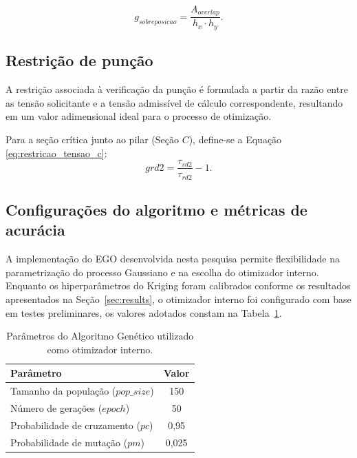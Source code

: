 \begin{equation}
g_{sobreposicao} = \frac{A_{overlap}}{h_x \cdot h_y}.
    \label{eq:restricao_sobreposicao}
\end{equation}

\subsection{Restrição de punção}

A restrição associada à verificação da punção é formulada a partir da razão entre as tensão solicitante e a tensão admissível de cálculo correspondente, resultando em um valor adimensional ideal para o processo de otimização.

Para a seção crítica junto ao pilar (Seção $C$), define-se a Equação \eqref{eq:restricao_tensao_c}:
\begin{equation}
grd2 = \frac{\tau_{sd2}}{\tau_{rd2}}-1.
    \label{eq:restricao_tensao_c}
\end{equation}

\subsection{Configurações do algoritmo e métricas de acurácia}\label{sec:config_metricas}

A implementação do EGO desenvolvida nesta pesquisa permite flexibilidade na parametrização do processo Gaussiano e na escolha do otimizador interno. Enquanto os hiperparâmetros do Kriging foram calibrados conforme os resultados apresentados na Seção~\ref{sec:results}, o otimizador interno foi configurado com base em testes preliminares, os valores adotados constam na Tabela~\ref{tab:param_ag}.

\begin{table}[htpb!]
\centering
\caption{Parâmetros do Algoritmo Genético utilizado como otimizador interno.}
\begin{tabular}{@{}lc@{}}
\toprule
\textbf{Parâmetro} & \textbf{Valor} \\ 
\midrule
Tamanho da população ($pop\_size$) & 150 \\
Número de gerações ($epoch$) & 50 \\
Probabilidade de cruzamento ($pc$) & 0,95 \\
Probabilidade de mutação ($pm$) & 0,025 \\
\bottomrule
\end{tabular}
\label{tab:param_ag}
\end{table}

